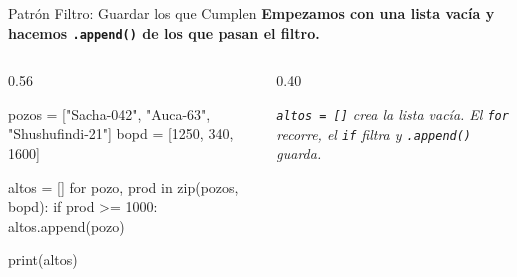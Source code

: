 \documentclass[aspectratio=169, 11pt]{beamer}
\begin{document}
\begin{frame}[fragile,shrink=12]{Patrón Filtro: Guardar los que Cumplen}
  \vspace{-4pt}
  {\small\color{arcaDark}\bfseries
    Empezamos con una lista \textbf{vacía} y hacemos \texttt{.append()} de los que pasan el filtro.}

  \vspace{5pt}
  \begin{columns}[T]
    \begin{column}{0.56\textwidth}
      \begin{pyblock}
pozos = ["Sacha-042", "Auca-63",
         "Shushufindi-21"]
bopd  = [1250, 340, 1600]

altos = []
for pozo, prod in zip(pozos, bopd):
    if prod >= 1000:
        altos.append(pozo)

print(altos)
      \end{pyblock}
    \end{column}

    \begin{column}{0.40\textwidth}
      \begin{outputblock}
      \end{outputblock}

      \vspace{4pt}
      {\scriptsize\color{textMuted}\itshape
        \texttt{altos = []} crea la lista vacía.
        El \texttt{for} recorre, el \texttt{if}
        filtra y \texttt{.append()} guarda.}
    \end{column}
  \end{columns}
\end{frame}
\end{document}
